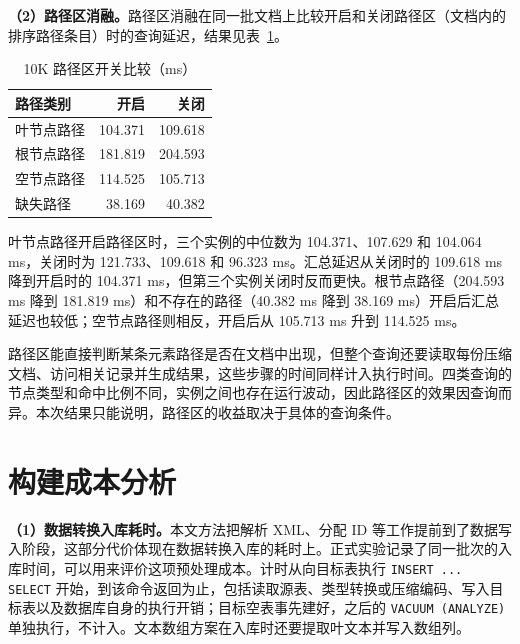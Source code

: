 \textbf{（2）路径区消融。}路径区消融在同一批文档上比较开启和关闭路径区（文档内的排序路径条目）时的查询延迟，结果见表~\ref{tab:exp-path-ablation}。
\begin{table}[htbp]
\centering\small
\caption{10K 路径区开关比较（ms）}
\label{tab:exp-path-ablation}
\begin{tabular}{lrr}
\toprule
路径类别 & 开启 & 关闭 \\
\midrule
叶节点路径 & 104.371 & 109.618 \\
根节点路径 & 181.819 & 204.593 \\
空节点路径 & 114.525 & 105.713 \\
缺失路径 & 38.169 & 40.382 \\
\bottomrule
\end{tabular}
\end{table}

叶节点路径开启路径区时，三个实例的中位数为 104.371、107.629 和 104.064 ms，关闭时为 121.733、109.618 和 96.323 ms。汇总延迟从关闭时的 109.618 ms 降到开启时的 104.371 ms，但第三个实例关闭时反而更快。根节点路径（204.593 ms 降到 181.819 ms）和不存在的路径（40.382 ms 降到 38.169 ms）开启后汇总延迟也较低；空节点路径则相反，开启后从 105.713 ms 升到 114.525 ms。

路径区能直接判断某条元素路径是否在文档中出现，但整个查询还要读取每份压缩文档、访问相关记录并生成结果，这些步骤的时间同样计入执行时间。四类查询的节点类型和命中比例不同，实例之间也存在运行波动，因此路径区的效果因查询而异。本次结果只能说明，路径区的收益取决于具体的查询条件。

\section{构建成本分析}
\textbf{（1）数据转换入库耗时。}本文方法把解析 XML、分配 ID 等工作提前到了数据写入阶段，这部分代价体现在数据转换入库的耗时上。正式实验记录了同一批次的入库时间，可以用来评价这项预处理成本。计时从向目标表执行 \texttt{INSERT ... SELECT} 开始，到该命令返回为止，包括读取源表、类型转换或压缩编码、写入目标表以及数据库自身的执行开销；目标空表事先建好，之后的 \texttt{VACUUM (ANALYZE)} 单独执行，不计入。文本数组方案在入库时还要提取叶文本并写入数组列。

